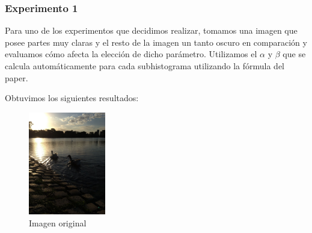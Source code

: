 \documentclass[10pt, a4paper]{article}
\begin{document}
\subsubsection{Experimento 1}

Para uno de los experimentos que decidimos realizar, tomamos una imagen que posee partes muy claras y el resto de la imagen un tanto oscuro en comparación y evaluamos cómo afecta la elección de dicho parámetro. Utilizamos el $\alpha$ y $\beta$ que se calcula automáticamente para cada subhistograma utilizando la fórmula del paper.

Obtuvimos los siguientes resultados:

\begin{figure}[H]
	\centering
        \includegraphics[width=0.3\textwidth]{patitos1.jpg}
        \caption{Imagen original}
\end{figure}
\end{document}
